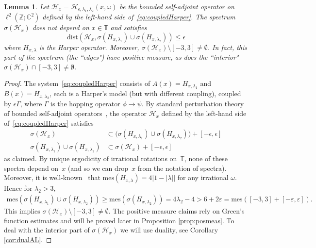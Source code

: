 \documentclass[11pt]{amsart}
\newtheorem{lemma}[theorem]{Lemma}
\newcommand{\Z}{\mathbb Z}
\newcommand{\C}{\mathbb C}
\def\mes{\mathrm{mes}}
\def\calH{\mathcal{H}}
\def\tor{\mathbb{T}}
\def\dist{\mathrm{dist}}
\begin{document}
\begin{lemma}
    \label{lem:calHspec}
  Let $\calH_x=\calH_{\epsilon,\lambda_1,\lambda_2}(x,\omega)$ be the bounded self-adjoint operator on $\ell^2(\Z;\C^2)$ defined by the left-hand side of~\eqref{eq:coupledHarper}.   The spectrum $\sigma(\calH_x)$ does not depend on $x\in\tor$ and satisfies 
  \[
  \dist(\calH_x,\sigma(H_{x,\lambda_1})\cup \sigma(H_{x,\lambda_2}) ) \le\epsilon
  \]
  where $H_{x,\lambda}$ is the Harper operator. Moreover, $ \sigma( \calH_x) \setminus [-3,3]\neq  \emptyset$. In fact, this part of the spectrum (the ``edges") have positive measure, as does the ``interior"  $\sigma( \calH_x) \cap [-3,3]\ne\emptyset$.
\end{lemma}
\begin{proof}
    The system~\eqref{eq:coupledHarper} consists of $A(x)=H_{x,\lambda_1}$ and $B(x)=H_{x,\lambda_2}$, each is a Harper's model (but with different coupling), coupled by $\epsilon\Gamma$, where $\Gamma$ is the hopping operator $\phi\to\psi$.   
By standard perturbation theory of bounded self-adjoint operators~\cite{Kato}, the operator $\calH_x$ defined by the left-hand side of~\eqref{eq:coupledHarper} satisfies
\begin{equation}\label{eq:calHx}
    \begin{split}
       \sigma(\calH_x) &\subset \big(\sigma(H_{x,\lambda_1})\cup \sigma(H_{x,\lambda_2}) \big) + [-\epsilon,\epsilon] \\ 
       \sigma(H_{x,\lambda_1})\cup \sigma(H_{x,\lambda_2}) &\subset \sigma(\calH_x) + [-\epsilon,\epsilon] 
    \end{split}
\end{equation}
as claimed. 
 By unique ergodicity of irrational rotations on~$\tor$,  none of these spectra depend on~$x$ (and so we can drop~$x$ from the notation of spectra). Moreover, it is well-known~\cite{AvMS,JK,AK} that $\mes(H_{x,\lambda})=4|1-|\lambda||$ for any irrational $\omega$. 
 Hence for $\lambda_2>3$,
 \begin{align}
     \mathrm{mes}(\sigma(H_{x,\lambda_1})\cup \sigma(H_{x,\lambda_2}))\geq \mathrm{mes}(\sigma(H_{x,\lambda_2}))=4\lambda_2-4>6+2\varepsilon=\mathrm{mes}([-3,3]+[-\varepsilon,\varepsilon]).
 \end{align}
 This implies $\sigma( \calH_x) \setminus [-3,3]\neq  \emptyset$.
 The positive measure claims rely on Green's function estimates and will be proved later in Proposition \ref{prop:posmeas}. To deal with the interior part of $\sigma(\calH_x)$ we will use duality, see Corollary \ref{cor:dualAL}.
\end{proof}
\end{document}
